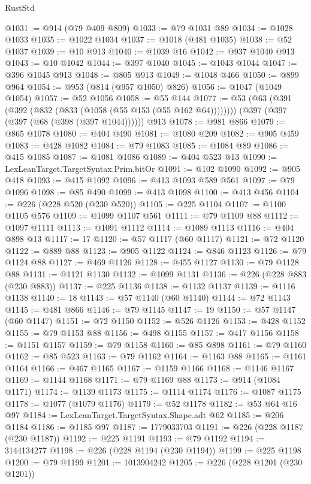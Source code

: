 \begin{lexlean}{RustStd}
\begin{coremodule}
@1031 := @914 (@79 @409 @809)
@1033 := @79 @1031 @89
@1034 := @1028 @1033
@1035 := @1022 @1034
@1037 := @1018 (@481 @1035)
@1038 := @52 @1037
@1039 := @10 @913
@1040 := @1039 @16
@1042 := @937 @1040 @913
@1043 := @10 @1042
@1044 := @397 @1040
@1045 := @1043 @1044
@1047 := @396 @1045 @913
@1048 := @805 @913
@1049 := @1048 @466
@1050 := @899 @964
@1054 := @953 (@814 (@957 @1050) @826)
@1056 := @1047 (@1049 @1054)
@1057 := @52 @1056
@1058 := @55 @144
@1077 := @53
    (@63 (@391 (@392 (@832 (@833 (@1058 (@55 @153 (@55 @162 @64))))))))
    (@397 (@397 (@397 (@68 (@398 (@397 @1044))))))
    @913
@1078 := @981 @866
@1079 := @865 @1078
@1080 := @404 @490
@1081 := @1080 @209
@1082 := @905 @459
@1083 := @428 @1082
@1084 := @79 @1083
@1085 := @1084 @89
@1086 := @415 @1085
@1087 := @1081 @1086
@1089 := @404 @523 @13
@1090 := LexLeanTarget.TargetSyntax.Prim.bitOr
@1091 := @102 @1090
@1092 := @905 @418
@1093 := @415 @1092
@1096 := @413 @1093 @589 @561
@1097 := @79 @1096
@1098 := @85 @490
@1099 := @413 @1098
@1100 := @413 @456
@1104 := @226 (@228 @520 (@230 @520))
@1105 := @225 @1104
@1107 := @1100 @1105 @576
@1109 := @1099 @1107 @561
@1111 := @79 @1109 @88
@1112 := @1097 @1111
@1113 := @1091 @1112
@1114 := @1089 @1113
@1116 := @404 @898 @13
@1117 := 17
@1120 := @57 @1117 (@60 @1117)
@1121 := @72 @1120
@1122 := @889 @88
@1123 := @905 @1122
@1124 := @846 @1123
@1126 := @79 @1124 @88
@1127 := @469 @1126
@1128 := @455 @1127
@1130 := @79 @1128 @88
@1131 := @1121 @1130
@1132 := @1099 @1131
@1136 := @226 (@228 @883 (@230 @883))
@1137 := @225 @1136
@1138 := @1132 @1137
@1139 := @1116 @1138
@1140 := 18
@1143 := @57 @1140 (@60 @1140)
@1144 := @72 @1143
@1145 := @481 @866
@1146 := @79 @1145
@1147 := 19
@1150 := @57 @1147 (@60 @1147)
@1151 := @72 @1150
@1152 := @526 @1126
@1153 := @428 @1152
@1155 := @79 @1153 @88
@1156 := @498 @1155
@1157 := @417 @1156
@1158 := @1151 @1157
@1159 := @79 @1158
@1160 := @85 @898
@1161 := @79 @1160
@1162 := @85 @523
@1163 := @79 @1162
@1164 := @1163 @88
@1165 := @1161 @1164
@1166 := @467 @1165
@1167 := @1159 @1166
@1168 := @1146 @1167
@1169 := @1144 @1168
@1171 := @79 @1169 @88
@1173 := @914 (@1084 @1171)
@1174 := @1139 @1173
@1175 := @1114 @1174
@1176 := @1087 @1175
@1178 := @1077 (@1079 @1176)
@1179 := @52 @1178
@1182 := @53 @64 @16 @97
@1184 := LexLeanTarget.TargetSyntax.Shape.adt @62
@1185 := @206 @1184
@1186 := @1185 @97
@1187 := 1779033703
@1191 := @226 (@228 @1187 (@230 @1187))
@1192 := @225 @1191
@1193 := @79 @1192
@1194 := 3144134277
@1198 := @226 (@228 @1194 (@230 @1194))
@1199 := @225 @1198
@1200 := @79 @1199
@1201 := 1013904242
@1205 := @226 (@228 @1201 (@230 @1201))

\end{coremodule}
\end{lexlean}
